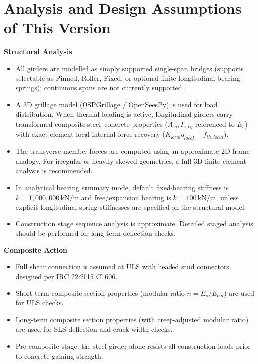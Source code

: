 \documentclass[12pt,a4paper]{report}
\numberwithin{table}{chapter}
\numberwithin{figure}{chapter}
\begin{document}
\clearpage
\section{Analysis and Design Assumptions of This Version}
\label{sec:assumptions}

\textbf{Structural Analysis}

\begin{itemize}
    \item All girders are modelled as simply supported single-span bridges (supports selectable as Pinned, Roller, Fixed, or optional finite longitudinal bearing springs); continuous spans are not currently supported.
    \item A 3D grillage model (OSPGrillage / OpenSeesPy) is used for load distribution. When thermal loading is active, longitudinal girders carry transformed composite steel--concrete properties ($A_{eq}, I_{z,eq}$ referenced to $E_s$) with exact element-local internal force recovery ($K_{local} q_{local} - f_{th,local}$).
    \item The transverse member forces are computed using an approximate 2D frame analogy. For irregular or heavily skewed geometries, a full 3D finite-element analysis is recommended.
    \item In analytical bearing summary mode, default fixed-bearing stiffness is $k = 1{,}000{,}000 \,\text{kN/m}$ and free/expansion bearing is $k = 100 \, \text{kN/m}$, unless explicit longitudinal spring stiffnesses are specified on the structural model.
    \item Construction stage sequence analysis is approximate. Detailed staged analysis should be performed for long-term deflection checks.
\end{itemize}

\textbf{Composite Action}

\begin{itemize}
    \item Full shear connection is assumed at ULS with headed stud connectors designed per IRC 22:2015 Cl.606.
    \item Short-term composite section properties (modular ratio $n = E_s/E_{cm}$) are used for ULS checks.
    \item Long-term composite section properties (with creep-adjusted modular ratio) are used for SLS deflection and crack-width checks.
    \item Pre-composite stage: the steel girder alone resists all construction loads prior to concrete gaining strength.
\end{itemize}
\end{document}
